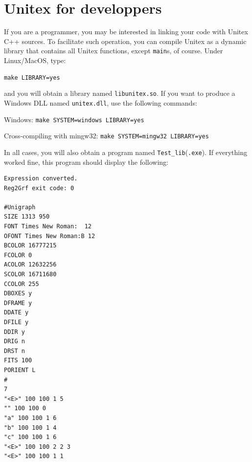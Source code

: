 \section{Unitex for developpers}
\label{section-unitex-developpers}
If you are a programmer, you may be interested in linking your code with Unitex
C++ sources. To facilitate such operation, you can compile Unitex as a
dynamic library that contains all Unitex functions, except \verb+main+s, of
course. Under Linux/MacOS, type:

\bigskip
\verb+make LIBRARY=yes+

\bigskip
\noindent and you will obtain a library named \verb+libunitex.so+. If you want
to produce a Windows DLL named \verb+unitex.dll+, use the following commands:

\bigskip
Windows: \verb+make SYSTEM=windows LIBRARY=yes+

Cross-compiling with mingw32: \verb+make SYSTEM=mingw32 LIBRARY=yes+

\bigskip
\noindent In all cases, you will also obtain a program named
\verb+Test_lib+(\verb+.exe+). If everything worked fine, this program should 
display the following:

\begin{verbatim}
Expression converted.
Reg2Grf exit code: 0

#Unigraph
SIZE 1313 950
FONT Times New Roman:  12
OFONT Times New Roman:B 12
BCOLOR 16777215
FCOLOR 0
ACOLOR 12632256
SCOLOR 16711680
CCOLOR 255
DBOXES y
DFRAME y
DDATE y
DFILE y
DDIR y
DRIG n
DRST n
FITS 100
PORIENT L
#
7
"<E>" 100 100 1 5
"" 100 100 0
"a" 100 100 1 6
"b" 100 100 1 4
"c" 100 100 1 6
"<E>" 100 100 2 2 3
"<E>" 100 100 1 1
\end{verbatim}
